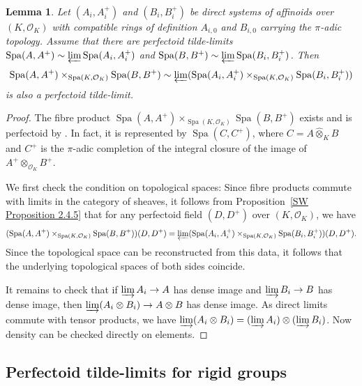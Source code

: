 \documentclass[10pt,oneside]{amsart}
\newtheorem{lemma}[theorem]{Lemma}
\theoremstyle{definition}
\renewcommand{\O}{\mathcal{O}}
\begin{document}
	\begin{lemma}\label{affinoid tilde-limits commute with fibre products}
		Let $(A_i, A_i^+)$ and $(B_i, B_i^+)$ be direct systems of affinoids over $(K, \mathcal O_K)$ with compatible rings of definition $A_{i,0}$ and $B_{i,0}$ carrying the $\pi$-adic topology. Assume that there are perfectoid tilde-limits $\operatorname{Spa}(A, A^+)\sim \varprojlim \operatorname{Spa}(A_i, A_i^+)$ and $\operatorname{Spa}(B, B^+)\sim \varprojlim \operatorname{Spa}(B_i, B_i^+)$. Then \[\operatorname{Spa}(A, A^+)\times_{\operatorname{Spa}(K, \mathcal O_K)}\operatorname{Spa}(B, B^+)\sim\varprojlim (\operatorname{Spa}(A_i, A_i^+)\times_{\operatorname{Spa}(K, \mathcal O_K)} \operatorname{Spa}(B_i, B_i^+))\]
		is also a perfectoid tilde-limit.
	\end{lemma}
	\begin{proof}
		The fibre product $\operatorname{Spa}(A, A^+)\times_{\operatorname{Spa}(K, \mathcal O_K)}\operatorname{Spa}(B, B^+)$ exists and is perfectoid by \cite[Prop 6.18]{perfectoid}. In fact, it is represented by $\operatorname{Spa}(C,C^+)$, where $C=A\widehat{\otimes}_KB$ and $C^+$ is the $\pi$-adic completion of the integral closure of the image of $A^+\otimes_{\mathcal O_K}B^+$.
		
		We first check the condition on topological spaces:
		 Since fibre products commute with limits in the category of sheaves, it follows from Proposition~\ref{SW Proposition 2.4.5} that for any perfectoid field $(D,D^+)$ over $(K,\O_K)$, we have 
\[
 (\operatorname{Spa}(A, A^+)\times_{\operatorname{Spa}(K, \mathcal O_K)}\operatorname{Spa}(B, B^+))(D,D^+)=\varprojlim (\operatorname{Spa}(A_i, A_i^+)\times_{\operatorname{Spa}(K, \mathcal O_K)} \operatorname{Spa}(B_i, B_i^+))(D,D^+).
\]
 Since the topological space can be reconstructed from this data, it follows that the underlying topological spaces of both sides coincide.
		
		It remains to check that if $\varinjlim A_i \rightarrow A$ has dense image and $\varinjlim B_i \rightarrow B$ has dense image, then $\varinjlim (A_i\otimes B_i) \rightarrow A\otimes B$ has dense image. As direct limits commute with tensor products, we have $\varinjlim (A_i\otimes B_i) = (\varinjlim A_i)\otimes (\varinjlim B_i)$. Now density can be checked directly on elements. 
	\end{proof}


\subsection{Perfectoid tilde-limits for rigid groups}
\end{document}
